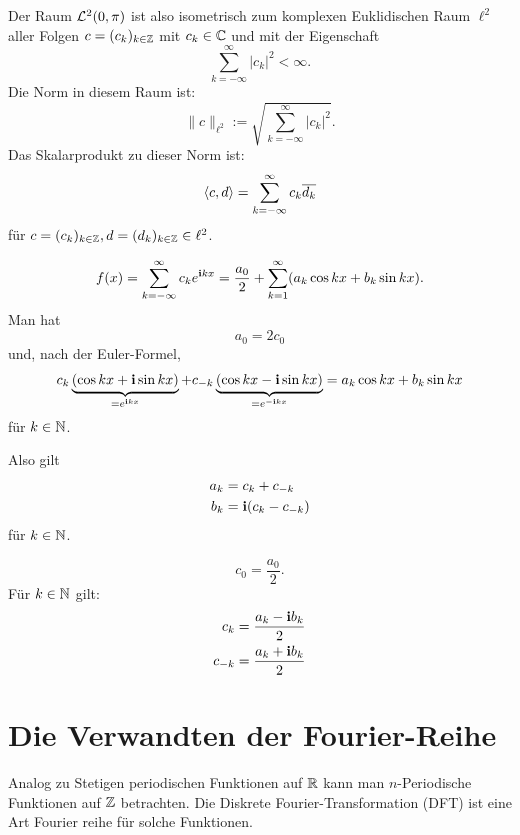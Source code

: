 \begin{bem} 
	Der Raum $\mathcal{L}^2(0,\pi)$ ist also isometrisch zum komplexen Euklidischen Raum $\ell^2$ aller Folgen $c = (c_k)_{k \in \mathbb{Z}}$ mit $c_k \in \mathbb{C}$ und mit 
	der Eigenschaft 
	\[
		\sum_{k = -\infty}^\infty |c_k|^2 < \infty. 
	\]
	Die Norm in diesem Raum ist: 
	\[
		\|c\|_{\ell^2} := \sqrt{ \sum_{k = -\infty}^\infty |c_k|^2 }.  
	\]
	Das Skalarprodukt zu dieser Norm ist: 
	\[
		\left< c , d \right> = \sum_{k=-\infty}^\infty c_k \overline{d_k} 
	\]
	für $c = (c_k)_{k \in \mathbb{Z}}, d = (d_k)_{k \in \mathbb{Z}}  \in \ell^2$. 
\end{bem} 

\begin{bem}
	\[
		f(x) = \sum_{k=-\infty}^\infty c_k e^{\mathbf{i} k x} = \frac{a_0}{2} +  \sum_{k=1}^\infty (a_k \cos k x + b_k \sin k x). 
	\]
	Man hat 
	\[
		a_0 = 2 c_0
	\]
	und, nach der Euler-Formel, 
	\[
		c_k \underbrace{(\cos k x + \mathbf{i} \sin k x)}_{=e^{\mathbf{i} kx}} + c_{-k} \underbrace{(\cos k x - \mathbf{i} \sin k x)}_{=e^{-\mathbf{i} kx}} = a_k \cos k x + b_k \sin k x
	\]
	für $k \in \mathbb{N}$. 
	
	Also gilt
	\begin{align*}
		a_k & = c_k + c_{-k} 
	\\	b_k & = \mathbf{i} (c_k - c_{-k}) 
	\end{align*}
	für $k \in \mathbb{N}$. 
\end{bem} 

\begin{bem}
	\[
		c_0 =\frac{a_0}{2}.
	\]
	Für $k \in \mathbb{N}$ gilt: 
	\begin{align*}
		c_k & = \frac{ a_k - \mathbf{i} b_k }{2}
	\\	c_{-k} & = \frac{a_k + \mathbf{i} b_k}{2} 
	\end{align*}
\end{bem} 



\section{Die Verwandten der Fourier-Reihe} 

\begin{bem}[Diksrete Fourier-Transformation (=DFT)]
Analog zu Stetigen periodischen Funktionen auf $\mathbb{R}$ kann man $n$-Periodische Funktionen auf $\mathbb{Z}$ betrachten. Die Diskrete Fourier-Transformation (DFT) ist eine Art Fourier reihe für solche Funktionen.
\end{bem} 

